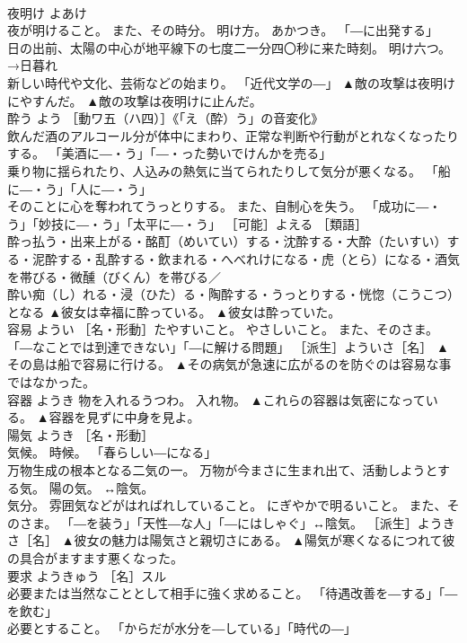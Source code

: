 \documentclass[8pt]{extreport}
\begin{document}
\begin{CJK}{UTF8}{min}
\\	夜明け	よあけ	
\\	夜が明けること。 また、その時分。 明け方。 あかつき。 「―に出発する」 
\\	日の出前、太陽の中心が地平線下の七度二一分四〇秒に来た時刻。 明け六つ。 →日暮れ 
\\	新しい時代や文化、芸術などの始まり。 「近代文学の―」	▲敵の攻撃は夜明けにやすんだ。 ▲敵の攻撃は夜明けに止んだ。
\\	酔う	よう	［動ワ五（ハ四）］《「え（酔）う」の音変化》 
\\	飲んだ酒のアルコール分が体中にまわり、正常な判断や行動がとれなくなったりする。 「美酒に―・う」「―・った勢いでけんかを売る」 
\\	乗り物に揺られたり、人込みの熱気に当てられたりして気分が悪くなる。 「船に―・う」「人に―・う」 
\\	そのことに心を奪われてうっとりする。 また、自制心を失う。 「成功に―・う」「妙技に―・う」「太平に―・う」 ［可能］よえる ［類語］
\\	酔っ払う・出来上がる・酩酊（めいてい）する・沈酔する・大酔（たいすい）する・泥酔する・乱酔する・飲まれる・へべれけになる・虎（とら）になる・酒気を帯びる・微醺（びくん）を帯びる／
\\	酔い痴（し）れる・浸（ひた）る・陶酔する・うっとりする・恍惚（こうこつ）となる	▲彼女は幸福に酔っている。 ▲彼女は酔っていた。
\\	容易	ようい	［名・形動］たやすいこと。 やさしいこと。 また、そのさま。 「―なことでは到達できない」「―に解ける問題」 ［派生］よういさ［名］	▲その島は船で容易に行ける。 ▲その病気が急速に広がるのを防ぐのは容易な事ではなかった。
\\	容器	ようき	物を入れるうつわ。 入れ物。	▲これらの容器は気密になっている。 ▲容器を見ずに中身を見よ。
\\	陽気	ようき	［名・形動］ 
\\	気候。 時候。 「春らしい―になる」 
\\	万物生成の根本となる二気の一。 万物が今まさに生まれ出て、活動しようとする気。 陽の気。 ↔陰気。 
\\	気分。 雰囲気などがはればれしていること。 にぎやかで明るいこと。 また、そのさま。 「―を装う」「天性―な人」「―にはしゃぐ」↔陰気。 ［派生］ようきさ［名］	▲彼女の魅力は陽気さと親切さにある。 ▲陽気が寒くなるにつれて彼の具合がますます悪くなった。
\\	要求	ようきゅう	［名］スル 
\\	必要または当然なこととして相手に強く求めること。 「待遇改善を―する」「―を飲む」 
\\	必要とすること。 「からだが水分を―している」「時代の―」 

\end{CJK}
\end{document}
